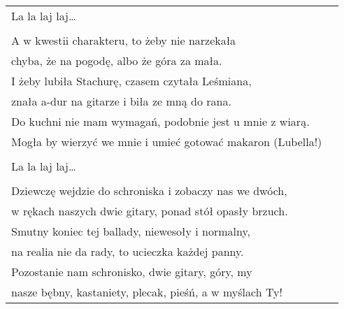 \documentclass[a5paper]{article}
\begin{document}
\begin{tabular}{@{}p{9.5cm}p{3cm}@{}}
\hspace{1cm}La la laj laj… \\ \\

A w kwestii charakteru, to żeby nie narzekała \\
chyba, że na pogodę, albo że góra za mała. \\
I żeby lubiła Stachurę, czasem czytała Leśmiana, \\
znała a-dur na gitarze i biła ze mną do rana.\\ 

Do kuchni nie mam wymagań, podobnie jest u mnie z wiarą. \\
Mogła by wierzyć we mnie i umieć gotować makaron (Lubella!) \\ \\

\hspace{1cm}La la laj laj… \\ \\

Dziewczę wejdzie do schroniska i zobaczy nas we dwóch, \\
w rękach naszych dwie gitary, ponad stół opasły brzuch. \\
Smutny koniec tej ballady, niewesoły i normalny, \\
na realia nie da rady, to ucieczka każdej panny. \\
Pozostanie nam schronisko, dwie gitary, góry, my \\
nasze bębny, kastaniety, plecak, pieśń, a w myślach Ty!
\end{tabular}
\end{document}
